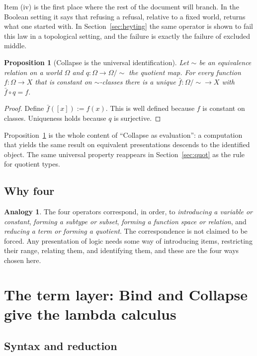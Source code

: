 \documentclass[11pt]{article}
\newcommand{\Om}{\Omega}
\theoremstyle{definition}
\newtheorem{analogy}[definition]{Analogy}
\theoremstyle{plain}
\newtheorem{proposition}[definition]{Proposition}
\theoremstyle{remark}
\begin{document}
Item (iv) is the first place where the rest of the document will branch. In the Boolean setting it says that refusing a refusal, relative to a fixed world, returns what one started with. In Section~\ref{sec:heyting} the same operator is shown to fail this law in a topological setting, and the failure is exactly the failure of excluded middle.

\begin{proposition}[Collapse is the universal identification]\label{prop:collapse}
Let $\sim$ be an equivalence relation on a world $\Om$ and $q:\Om\to\Om/{\sim}$ the quotient map. For every function $f:\Om\to X$ that is constant on $\sim$-classes there is a unique $\bar f:\Om/{\sim}\to X$ with $\bar f\circ q=f$.
\end{proposition}
\begin{proof}
Define $\bar f([x]):=f(x)$. This is well defined because $f$ is constant on classes. Uniqueness holds because $q$ is surjective.
\end{proof}

Proposition~\ref{prop:collapse} is the whole content of ``Collapse as evaluation'': a computation that yields the same result on equivalent presentations descends to the identified object. The same universal property reappears in Section~\ref{sec:quot} as the rule for quotient types.

\subsection{Why four}

\begin{analogy}\label{an:four}
The four operators correspond, in order, to \emph{introducing a variable or constant}, \emph{forming a subtype or subset}, \emph{forming a function space or relation}, and \emph{reducing a term or forming a quotient}. The correspondence is not claimed to be forced. Any presentation of logic needs some way of introducing items, restricting their range, relating them, and identifying them, and these are the four ways chosen here.
\end{analogy}

\section{The term layer: Bind and Collapse give the lambda calculus}\label{sec:terms}

\subsection{Syntax and reduction}
\end{document}
